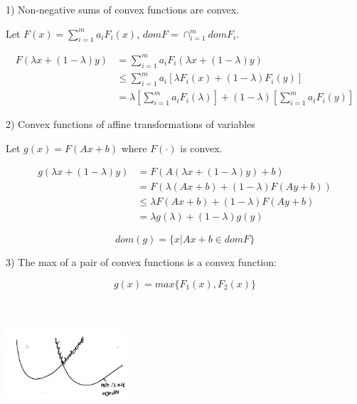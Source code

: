 1) Non-negative sums of convex functions are convex.

Let $F(x) =\sum^m_{i=1}a_iF_i(x)$, $domF = \cap^m_{i=1}domF_i$. 

\begin{align*}
F(\lambda x + (1-\lambda)y) &= \sum^m_{i=1}a_iF_i(\lambda x + (1-\lambda)y)\\
&\leq \sum^m_{i=1}a_i[\lambda F_i(x) + (1-\lambda)F_i(y)]\\
&= \lambda[\sum^m_{i=1}a_iF_i(\lambda)] + (1-\lambda)[\sum^m_{i=1}a_iF_i(y)]
\end{align*}

2) Convex functions of affine transformations of variables

Let $g(x) =F(Ax + b)$ where $F(\cdot)$ is convex.

\begin{align*}
g(\lambda x + (1-\lambda)y) &= F(A(\lambda x + (1-\lambda)y) + b)\\
&= F(\lambda(Ax + b) + (1-\lambda)F(Ay+b))\\
&\leq \lambda F(Ax + b) + (1-\lambda)F(Ay+b)\\
&= \lambda g(\lambda) + (1-\lambda)g(y)
\end{align*}

\begin{equation*}
dom(g) = \{x|Ax + b \in domF \}
\end{equation*}


3) The max of a pair of convex functions is a convex function:

\begin{equation*}
g(x) = max\{F_1(x), F_2(x) \}
\end{equation*}


\begin{marginfigure}
	\centering
	\includegraphics[width=1.8in,height=1.8in]{figures/ch08/figure1030_14.png}
\end{marginfigure}


